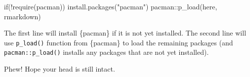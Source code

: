 \documentclass[
  letterpaper,
  DIV=11,
  numbers=noendperiod]{scrreprt}
\newenvironment{Shaded}{\begin{snugshade}}{\end{snugshade}}
\newcommand{\ControlFlowTok}[1]{\textcolor[rgb]{0.00,0.23,0.31}{#1}}
\newcommand{\FunctionTok}[1]{\textcolor[rgb]{0.28,0.35,0.67}{#1}}
\newcommand{\NormalTok}[1]{\textcolor[rgb]{0.00,0.23,0.31}{#1}}
\newcommand{\SpecialCharTok}[1]{\textcolor[rgb]{0.37,0.37,0.37}{#1}}
\newcommand{\StringTok}[1]{\textcolor[rgb]{0.13,0.47,0.30}{#1}}
\begin{document}
\begin{Shaded}
\begin{Highlighting}[]
\ControlFlowTok{if}\NormalTok{(}\SpecialCharTok{!}\FunctionTok{require}\NormalTok{(pacman)) }\FunctionTok{install.packages}\NormalTok{(}\StringTok{"pacman"}\NormalTok{)}
\NormalTok{pacman}\SpecialCharTok{::}\FunctionTok{p\_load}\NormalTok{(here, rmarkdown)}
\end{Highlighting}
\end{Shaded}

The first line will install \{pacman\} if it is not yet installed. The
second line will use \texttt{p\_load()} function from \{pacman\} to load
the remaining packages (and \texttt{pacman::p\_load()} installs any
packages that are not yet installed).

Phew! Hope your head is still intact.
\end{document}
